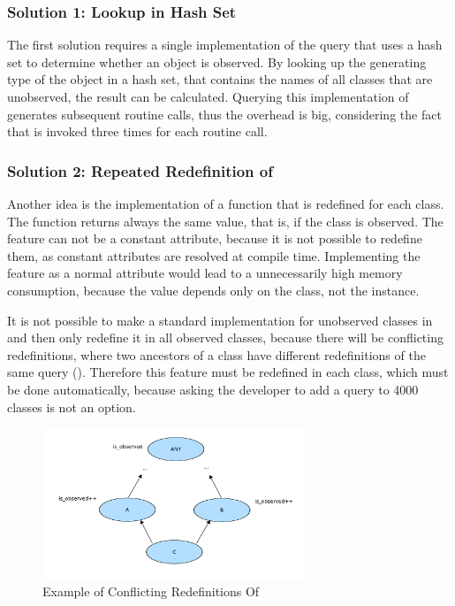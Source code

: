 \subsubsection{Solution 1: Lookup in Hash Set}
The first solution requires a single implementation of the query  that uses a hash set to determine whether an object is observed. By looking up the generating type of the object in a hash set, that contains the names of all classes that are unobserved, the result can be calculated. Querying this implementation of  generates subsequent routine calls, thus the overhead is big, considering the fact that  is invoked three times for each routine call.

\subsubsection{Solution 2: Repeated Redefinition of }
Another idea is the implementation of a function that is redefined for each class. The function returns always the same value, that is, if the class is observed. The feature can not be a constant attribute, because it is not possible to redefine them, as constant attributes  are resolved at compile time. Implementing the feature as a normal attribute would lead to a unnecessarily high memory consumption, because the value depends only on the class, not the instance.

It is not possible to make a standard implementation for unobserved classes in  and then only redefine it in all observed classes, because there will be conflicting redefinitions, where two ancestors of a class have different redefinitions of the same query \cite{oosc2} (). Therefore this feature must be redefined in each class, which must be done automatically, because asking the developer to add a query to 4000 classes is not an option.
\begin{figure}[ht]
  \centering
  \includegraphics[width=0.7\textwidth]{illustrations/observed_query_conflicting_redefinitions}
  \caption{Example of Conflicting Redefinitions Of }
  \label{fig:observed_query_conflicting_redefinitions}
\end{figure}

